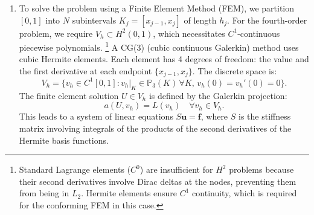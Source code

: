 \begin{solution}
\begin{enumerate}
    \item[(c)] To solve the problem using a Finite Element Method (FEM), we partition $[0, 1]$ into $N$ subintervals $K_j = [x_{j-1}, x_j]$ of length $h_j$. For the fourth-order problem, we require $V_h \subset H^2(0, 1)$, which necessitates $C^1$-continuous piecewise polynomials. \footnote{Standard Lagrange elements ($C^0$) are insufficient for $H^2$ problems because their second derivatives involve Dirac deltas at the nodes, preventing them from being in $L_2$. Hermite elements ensure $C^1$ continuity, which is required for the conforming FEM in this case.} A CG(3) (cubic continuous Galerkin) method uses cubic Hermite elements.
    Each element has 4 degrees of freedom: the value and the first derivative at each endpoint $\{x_{j-1}, x_j\}$. The discrete space is:
    \[
    V_h = \{ v_h \in C^1[0, 1] : v_h|_K \in \mathbb{P}_3(K) \, \forall K, \, v_h(0) = v_h'(0) = 0 \}.
    \]
    The finite element solution $U \in V_h$ is defined by the Galerkin projection:
    \[
    a(U, v_h) = L(v_h) \quad \forall v_h \in V_h.
    \]
    This leads to a system of linear equations $S \mathbf{u} = \mathbf{f}$, where $S$ is the stiffness matrix involving integrals of the products of the second derivatives of the Hermite basis functions.


\end{enumerate}
\end{solution}
